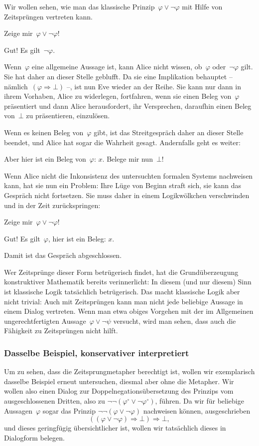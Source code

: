 \documentclass[a4paper,ngerman,12pt]{scrartcl}
\theoremstyle{definition}
\theoremstyle{plain}
\theoremstyle{remark}
\renewcommand{\_}{\mathpunct{.}\,}
\newcommand{\?}{\,{:}\,}
\newcommand{\Alice}{\item[Alice]}
\newcommand{\Eve}{\item[Eve]}
\newenvironment{dialogue}[1]{%
  \begin{list}{}{%
    \settowidth{\labelwidth}{\qquad\emph{#1:}}
    \setlength{\labelsep}{0.3cm}
    \setlength{\leftmargin}{\labelwidth}
    \addtolength{\leftmargin}{\labelsep}
    \setlength{\rightmargin}{0pt}
    \setlength{\parsep}{0.5ex plus 0.2ex minus 0.1ex}
    \setlength{\itemsep}{0 ex plus 0.2ex}
    \renewcommand{\makelabel}[1]{\qquad\emph{##1:}\hfil}
    }
}{\end{list}}
\begin{document}
Wir wollen sehen, wie man das klassische Prinzip~$\varphi \vee
\neg\varphi$ mit Hilfe von Zeitsprüngen vertreten kann.
\begin{dialogue}{Alice}
\Eve Zeige mir~$\varphi \vee \neg\varphi$!
\Alice Gut! Es gilt~$\neg\varphi$.
\end{dialogue}
Wenn~$\varphi$ eine allgemeine Aussage ist, kann Alice nicht wissen,
ob~$\varphi$ oder~$\neg\varphi$ gilt. Sie hat daher an dieser Stelle geblufft.
Da sie eine Implikation behauptet -- nämlich~$(\varphi \Rightarrow \bot)$ --, ist nun Eve
wieder an der Reihe. Sie kann nur dann in ihrem Vorhaben, Alice zu widerlegen,
fortfahren, wenn sie einen Beleg von~$\varphi$ präsentiert und dann Alice
herausfordert, ihr Versprechen, daraufhin einen Beleg von~$\bot$ zu
präsentieren, einzulösen.

Wenn es keinen Beleg von~$\varphi$ gibt, ist das Streitgespräch daher an dieser
Stelle beendet, und Alice hat sogar die Wahrheit gesagt. Andernfalls geht es
weiter:
\begin{dialogue}{Alice}
\Eve Aber hier ist ein Beleg von~$\varphi$: $x$. Belege mir nun~$\bot$!
\end{dialogue}
Wenn Alice nicht die Inkonsistenz des untersuchten formalen Systems nachweisen
kann, hat sie nun ein Problem: Ihre Lüge von Beginn straft sich, sie kann das
Gespräch nicht fortsetzen. Sie muss daher in einem Logikwölkchen verschwinden
und in der Zeit zurückspringen:
\begin{dialogue}{Alice}
\Eve Zeige mir~$\varphi \vee \neg\varphi$!
\Alice Gut! Es gilt~$\varphi$, hier ist ein Beleg: $x$.
\end{dialogue}
Damit ist das Gespräch abgeschlossen.

Wer Zeitsprünge dieser Form betrügerisch findet, hat die
Grund\-über\-zeu\-gung konstruktiver Mathematik bereits verinnerlicht: In diesem (und
nur diesem) Sinn ist klassische Logik tatsächlich betrügerisch. Das macht
klassische Logik aber nicht trivial: Auch mit Zeitsprüngen kann man nicht jede
beliebige Aussage in einem Dialog vertreten. Wenn man etwa obiges Vorgehen
mit der im Allgemeinen ungerechtfertigten Aussage~$\varphi \vee \neg\psi$
versucht, wird man sehen, dass auch die Fähigkeit zu Zeitsprüngen
nicht hilft.


\subsubsection*{Dasselbe Beispiel, konservativer interpretiert}

Um zu sehen, dass die Zeitsprungmetapher berechtigt ist, wollen wir
exemplarisch dasselbe Beispiel erneut untersuchen, diesmal aber ohne die
Metapher. Wir wollen also einen
Dialog zur
Dop\-pel\-ne\-ga\-tions\-über\-set\-zung des Prinzips vom ausgeschlossenen
Dritten, also zu $\neg\neg(\varphi^\circ \vee \neg\varphi^\circ)$, führen. Da wir
für beliebige Aussagen~$\varphi$ sogar das Prinzip $\neg\neg(\varphi \vee
\neg\varphi)$ nachweisen können, ausgeschrieben
\[ ((\varphi \vee \neg\varphi) \Rightarrow \bot) \Rightarrow \bot, \]
und dieses geringfügig übersichtlicher ist, wollen wir tatsächlich dieses in Dialogform
belegen.
\end{document}
